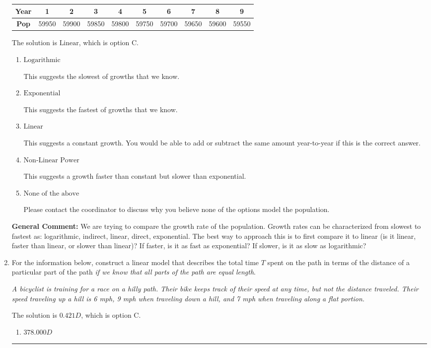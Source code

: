 \documentclass{extbook}[14pt]
\newcommand{\litem}[1]{\item #1

\rule{\textwidth}{0.4pt}}
\begin{document}
\begin{enumerate}
{\begin{tabular}{c|c|c|c|c|c|c|c|c|c}
\textbf{Year} &1 &2 &3 &4 &5 &6 &7 &8 &9\tabularnewline \hline
\textbf{Pop} &59950 &59900 &59850 &59800 &59750 &59700 &59650 &59600 &59550\end{tabular}The solution is \( \text{Linear} \), which is option C.\begin{enumerate}[label=\Alph*.]
\item \( \text{Logarithmic} \)

This suggests the slowest of growths that we know.
\item \( \text{Exponential} \)

This suggests the fastest of growths that we know.
\item \( \text{Linear} \)

This suggests a constant growth. You would be able to add or subtract the same amount year-to-year if this is the correct answer.
\item \( \text{Non-Linear Power} \)

This suggests a growth faster than constant but slower than exponential.
\item \( \text{None of the above} \)

Please contact the coordinator to discuss why you believe none of the options model the population.
\end{enumerate}

\textbf{General Comment:} We are trying to compare the growth rate of the population. Growth rates can be characterized from slowest to fastest as: logarithmic, indirect, linear, direct, exponential. The best way to approach this is to first compare it to linear (is it linear, faster than linear, or slower than linear)? If faster, is it as fast as exponential? If slower, is it as slow as logarithmic?
}
\litem{
For the information below, construct a linear model that describes the total time $T$ spent on the path in terms of the distance of a particular part of the path \textit{if we know that all parts of the path are equal length}.

\begin{center}
    \textit{ A bicyclist is training for a race on a hilly path. Their bike keeps track of their speed at any time, but not the distance traveled. Their speed traveling up a hill is 6 mph, 9 mph when traveling down a hill, and 7 mph when traveling along a flat portion. }
\end{center}
The solution is \( 0.421 D \), which is option C.\begin{enumerate}[label=\Alph*.]
\item \( 378.000 D \)


\end{enumerate}}
\end{enumerate}
\end{document}
